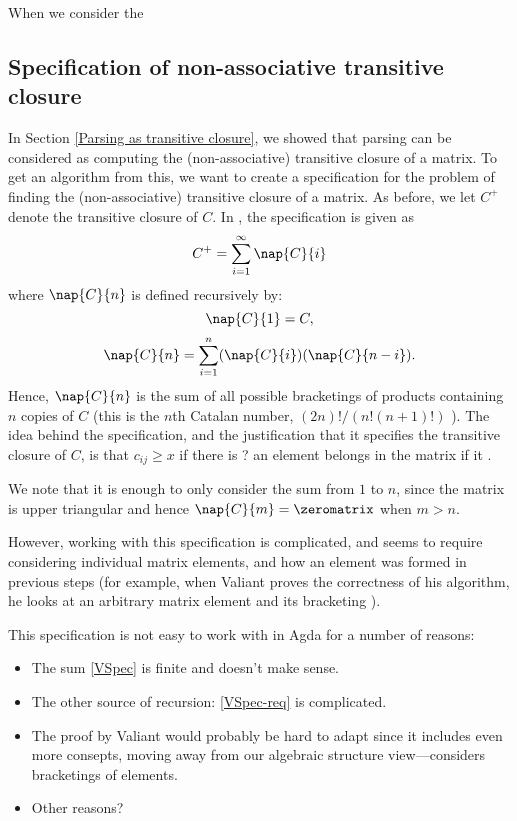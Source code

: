 When we consider the 

\subsection{Specification of non-associative transitive closure}
In Section \ref{Parsing as transitive closure}, we showed that parsing can be considered as computing the (non-associative) transitive closure of a matrix. To get an algorithm from this, we want to create a specification for the problem of finding the (non-associative) transitive closure of a matrix. As before, we let $C^+$ denote the transitive closure of $C$. In \cite{Valiant}, the specification is given as
\begin{equation}
  \label{VSpec}
  C^+ = \sum_{i = 1}^{\infty}\nap{C}{i}
\end{equation}
where $\nap{C}{n}$ is defined recursively by:
\begin{equation}
  \nap{C}{1} = C,
\end{equation}
\begin{equation}
  \label{VSpec-rec}
  \nap{C}{n} = \sum_{i = 1}^n(\nap{C}{i})(\nap{C}{n-i}).
\end{equation}
Hence, $\nap{C}{n}$ is the sum of all possible bracketings of products containing $n$ copies of $C$ (this is the $n$th Catalan number, $(2n)!/(n!(n+1)!)$ \cite{mathworld-catalan}).
The idea behind the specification, and the justification that it specifies the transitive closure of $C$, is that $c_{ij} \ge x$ if there is ? an element belongs in the matrix if it .

We note that it is enough to only consider the sum from $1$ to $n$, since the matrix is upper triangular and hence $\nap{C}{m} = \zeromatrix$ when $m > n$.

However, working with this specification is complicated, and seems to require considering individual matrix elements, and how an element was formed in previous steps (for example, when Valiant proves the correctness of his algorithm, he looks at an arbitrary matrix element and its bracketing \cite{Valiant} ). 

This specification is not easy to work with in Agda for a number of reasons:
\begin{itemize}
\item The sum \eqref{VSpec} is finite and doesn't make sense.
\item The other source of recursion: \eqref{VSpec-req} is complicated.
\item The proof by Valiant would probably be hard to adapt since it includes even more consepts, moving away from our algebraic structure view---considers bracketings of elements.
\item Other reasons?
\end{itemize}

